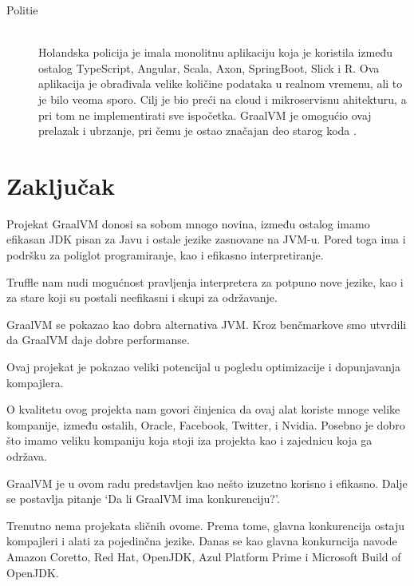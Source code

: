 \documentclass[a4paper]{article}
\begin{document}
\begin{description}
	\item[Politie]  \hfill \\
	Holandska policija je imala monolitnu aplikaciju koja je koristila između ostalog TypeScript, Angular, Scala, Axon, SpringBoot, Slick i R. Ova aplikacija je obrađivala velike količine podataka u realnom vremenu, ali to je bilo veoma sporo. Cilj je bio preći na cloud i mikroservisnu ahitekturu, a pri tom ne implementirati sve ispočetka. GraalVM je omogućio ovaj prelazak i ubrzanje, pri čemu je ostao značajan deo starog koda \cite{graalvmusecases}.
\end{description}

\section{Zaključak}
\label{sec:zakljucak}


Projekat GraalVM donosi sa sobom mnogo novina, između ostalog imamo efikasan JDK pisan za Javu i ostale jezike zasnovane na JVM-u. Pored toga ima i podršku za poliglot programiranje, kao i efikasno interpretiranje. 

Truffle nam nudi mogućnost pravljenja interpretera za potpuno nove jezike, kao i za stare koji su postali neefikasni i skupi za održavanje.

GraalVM se pokazao kao dobra alternativa JVM. Kroz benčmarkove smo utvrdili da GraalVM daje dobre performanse. 

Ovaj projekat je pokazao veliki potencijal u pogledu optimizacije i dopunjavanja kompajlera.

O kvalitetu ovog projekta nam govori činjenica da ovaj alat koriste mnoge velike kompanije, između ostalih, Oracle, Facebook, Twitter, i Nvidia. Posebno je dobro što imamo veliku kompaniju koja stoji iza projekta kao i zajednicu koja ga održava.

GraalVM je u ovom radu predstavljen kao nešto izuzetno korisno i efikasno. Dalje se postavlja pitanje `Da li GraalVM ima konkurenciju?'.

Trenutno nema projekata sličnih ovome. Prema tome, glavna konkurencija ostaju kompajleri i alati za pojedinčna jezike. Danas se kao glavna konkurncija navode Amazon Coretto, Red Hat, OpenJDK, Azul Platform Prime i Microsoft Build of OpenJDK. 

\appendix
 

\end{document}

